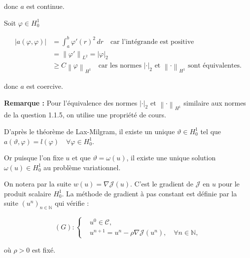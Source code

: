 \documentclass{article}
\newcommand{\Integer}{ \mathbb{N} }
\newcommand{\Abs}[1]{ \left| #1 \right| }
\newcommand{\Norm}[2]{ \left\| #1 \right\|_{#2} }
\newcommand{\Integral}[4]{ \int_{#1}^{#2} #3 \, d#4 }
\newcommand{\SetC}{\mathcal{C}}
\newcommand{\FunctionJ}{\mathcal{J}}
\begin{document}
{    donc $a$ est continue.\newline

    Soit $\varphi \in H^1_0$

    \begin{align*}
        \Abs{a(\varphi, \varphi)} &= \Integral{a}{b}{\varphi'(r)^2}{r} \quad \text{car l'intégrande est positive}\\
        &= \Norm{\varphi'}{L^2} = \Abs{\varphi}_2 \\
        &\geq C  \Norm{\varphi}{H^1} \quad \text{car les normes } \Abs{\cdot}_2 \text{ et }\Norm{\cdot}{H^1} \text{ sont équivalentes.}
    \end{align*}

    donc $a$ est coercive.\newline

    \textbf{Remarque :} Pour l'équivalence des normes $\Abs{\cdot}_2 \text{ et }\Norm{\cdot}{H^1}$ similaire aux normes de la question 1.1.5, on utilise une propriété de cours.\newline

    D'après le théorème de Lax-Milgram, il existe un unique $\vartheta \in H^1_0$ tel que $a(\vartheta, \varphi) = l(\varphi) \quad \forall \varphi \in H^1_0$.\newline

    Or puisque l'on fixe $u$ et que $\vartheta = \omega(u)$, il existe une unique solution $\omega(u) \in H^1_0$ au problème variationnel.\newline
    
        
}

On notera par la suite $w(u) = \nabla\FunctionJ(u)$. C'est le gradient de $\FunctionJ$ en $u$ pour le produit scalaire $H^1_0$. La méthode de gradient à pas constant est définie par la suite $(u^n)_{n\in\Integer}$ qui vérifie :

\begin{equation}
(G): \left\{
\begin{aligned}
    & u^0 \in \SetC, \\
    & u^{n+1} = u^n - \rho\nabla\FunctionJ(u^n), \quad \forall n \in \Integer,
\end{aligned}
\right.
\end{equation}

où $\rho > 0$ est fixé.
\end{document}
